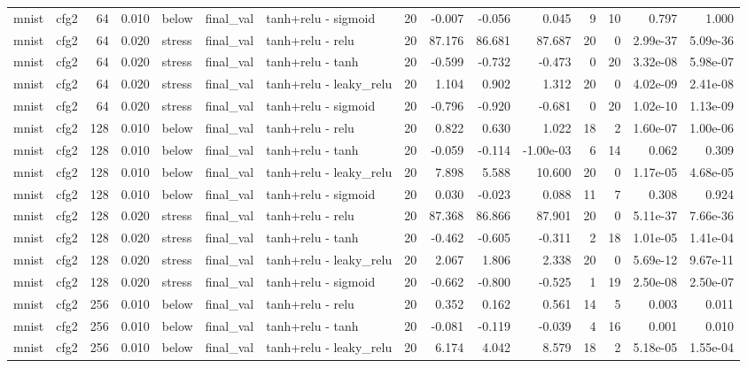 \begin{table}[htbp]
{\begin{tabular}{@{}llrrlllrrrrrrrr@{}}
mnist & cfg2 & 64 & 0.010 & below & final\_val & tanh+relu - sigmoid & 20 & -0.007 & -0.056 & 0.045 & 9 & 10 & 0.797 & 1.000 \\
mnist & cfg2 & 64 & 0.020 & stress & final\_val & tanh+relu - relu & 20 & 87.176 & 86.681 & 87.687 & 20 & 0 & 2.99e-37 & 5.09e-36 \\
mnist & cfg2 & 64 & 0.020 & stress & final\_val & tanh+relu - tanh & 20 & -0.599 & -0.732 & -0.473 & 0 & 20 & 3.32e-08 & 5.98e-07 \\
mnist & cfg2 & 64 & 0.020 & stress & final\_val & tanh+relu - leaky\_relu & 20 & 1.104 & 0.902 & 1.312 & 20 & 0 & 4.02e-09 & 2.41e-08 \\
mnist & cfg2 & 64 & 0.020 & stress & final\_val & tanh+relu - sigmoid & 20 & -0.796 & -0.920 & -0.681 & 0 & 20 & 1.02e-10 & 1.13e-09 \\
mnist & cfg2 & 128 & 0.010 & below & final\_val & tanh+relu - relu & 20 & 0.822 & 0.630 & 1.022 & 18 & 2 & 1.60e-07 & 1.00e-06 \\
mnist & cfg2 & 128 & 0.010 & below & final\_val & tanh+relu - tanh & 20 & -0.059 & -0.114 & -1.00e-03 & 6 & 14 & 0.062 & 0.309 \\
mnist & cfg2 & 128 & 0.010 & below & final\_val & tanh+relu - leaky\_relu & 20 & 7.898 & 5.588 & 10.600 & 20 & 0 & 1.17e-05 & 4.68e-05 \\
mnist & cfg2 & 128 & 0.010 & below & final\_val & tanh+relu - sigmoid & 20 & 0.030 & -0.023 & 0.088 & 11 & 7 & 0.308 & 0.924 \\
mnist & cfg2 & 128 & 0.020 & stress & final\_val & tanh+relu - relu & 20 & 87.368 & 86.866 & 87.901 & 20 & 0 & 5.11e-37 & 7.66e-36 \\
mnist & cfg2 & 128 & 0.020 & stress & final\_val & tanh+relu - tanh & 20 & -0.462 & -0.605 & -0.311 & 2 & 18 & 1.01e-05 & 1.41e-04 \\
mnist & cfg2 & 128 & 0.020 & stress & final\_val & tanh+relu - leaky\_relu & 20 & 2.067 & 1.806 & 2.338 & 20 & 0 & 5.69e-12 & 9.67e-11 \\
mnist & cfg2 & 128 & 0.020 & stress & final\_val & tanh+relu - sigmoid & 20 & -0.662 & -0.800 & -0.525 & 1 & 19 & 2.50e-08 & 2.50e-07 \\
mnist & cfg2 & 256 & 0.010 & below & final\_val & tanh+relu - relu & 20 & 0.352 & 0.162 & 0.561 & 14 & 5 & 0.003 & 0.011 \\
mnist & cfg2 & 256 & 0.010 & below & final\_val & tanh+relu - tanh & 20 & -0.081 & -0.119 & -0.039 & 4 & 16 & 0.001 & 0.010 \\
mnist & cfg2 & 256 & 0.010 & below & final\_val & tanh+relu - leaky\_relu & 20 & 6.174 & 4.042 & 8.579 & 18 & 2 & 5.18e-05 & 1.55e-04 \\

\end{tabular}}
\end{table}
